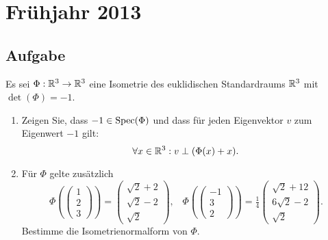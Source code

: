 \newpage

\section{Frühjahr 2013}

\subsection{Aufgabe}
Es sei \( \Phi: \mathbb{R}^3 \to \mathbb{R}^3 \) eine Isometrie des euklidischen Standardraums \( \mathbb{R}^3 \) mit \( \det(\Phi) = -1 \).
\begin{enumerate}
	\item Zeigen Sie, dass \( -1 \in \text{Spec}(\Phi) \) und dass für jeden Eigenvektor \( v \) zum Eigenwert \( -1 \) gilt:
	\begin{equation*}
	 	\forall x \in \mathbb{R}^3: v \perp (\Phi(x)+x)\text{.}
	 \end{equation*} 
	 \item Für \( \Phi \) gelte zusätzlich
	 \begin{equation*}
	 	\Phi\left( \left( \begin{smallmatrix}
	 		 1 \\ 2 \\ 3
	 	\end{smallmatrix} \right) \right) = \left( \begin{smallmatrix}
	 		\sqrt{2}+2 \\ \sqrt{2}-2 \\ \sqrt{2}
	 	\end{smallmatrix} \right)\text{,} \quad \Phi\left( \left( \begin{smallmatrix}
	 		-1 \\ 3 \\ 2
	 	\end{smallmatrix} \right) \right) = \tfrac{1}{4}\left( \begin{smallmatrix}
	 		\sqrt{2}+12 \\ 6\sqrt{2} -2 \\ \sqrt{2}
	 	\end{smallmatrix} \right)\text{.}
	 \end{equation*}
	 Bestimme die Isometrienormalform von \( \Phi \).
\end{enumerate}

